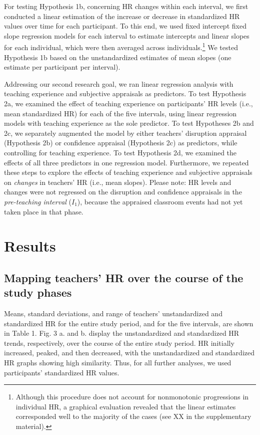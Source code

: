 \documentclass[preprint, 3p,
authoryear]{elsarticle} %
\begin{document}
For testing Hypothesis 1b, concerning HR changes within each interval,
we first conducted a linear estimation of the increase or decrease in
standardized HR values over time for each participant. To this end, we
used fixed intercept fixed slope regression models
\citep{gelman2006data} for each interval to estimate intercepts and
linear slopes for each individual, which were then averaged across
individuals.\footnote{Although this procedure does not account for
  nonmonotonic progressions in individual HR, a graphical evaluation
  revealed that the linear estimates corresponded well to the majority
  of the cases (see XX in the supplementary material).} We tested
Hypothesis 1b based on the unstandardized estimates of mean slopes (one
estimate per participant per interval).

Addressing our second research goal, we ran linear regression analysis
with teaching experience and subjective appraisals as predictors. To
test Hypothesis 2a, we examined the effect of teaching experience on
participants' HR levels (i.e., mean standardized HR) for each of the
five intervals, using linear regression models with teaching experience
as the sole predictor. To test Hypotheses 2b and 2c, we separately
augmented the model by either teachers' disruption appraisal (Hypothesis
2b) or confidence appraisal (Hypothesis 2c) as predictors, while
controlling for teaching experience. To test Hypothesis 2d, we examined
the effects of all three predictors in one regression model.
Furthermore, we repeated these steps to explore the effects of teaching
experience and subjective appraisals on \emph{changes} in teachers' HR
(i.e., mean slopes). Please note: HR levels and changes were not
regressed on the disruption and confidence appraisals in the
\emph{pre-teaching interval} (\(I_1\)), because the appraised classroom
events had not yet taken place in that phase.

\section{Results}\label{results}

\subsection{Mapping teachers' HR over the course of the study
phases}\label{mapping-teachers-hr-over-the-course-of-the-study-phases}

Means, standard deviations, and range of teachers' unstandardized and
standardized HR for the entire study period, and for the five intervals,
are shown in Table 1. Fig. 3 a. and b. display the unstandardized and
standardized HR trends, respectively, over the course of the entire
study period. HR initially increased, peaked, and then decreased, with
the unstandardized and standardized HR graphs showing high similarity.
Thus, for all further analyses, we used participants' standardized HR
values.
\end{document}
